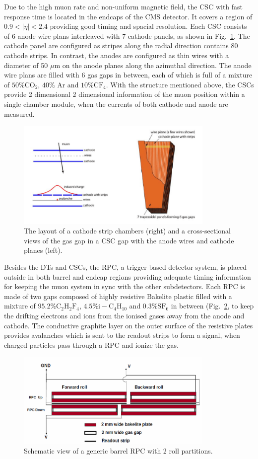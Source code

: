 Due to the high muon rate and non-uniform magnetic field, the CSC with fast response time is located in the endcaps of the CMS detector.
It covers a region of $0.9 < |\eta| < 2.4$ providing good timing and spacial resolution.
Each CSC consists of 6 anode wire plans interleaved with 7 cathode panels, as shown in Fig.~\ref{fig:cms_CSC}.
The cathode panel are configured as stripes along the radial direction contains 80 cathode strips.
In contrast, the anodes are configured as thin wires with a diameter of 50 $\mu$m on the anode planes along the azimuthal direction.
The anode wire plans are filled with 6 gas gaps in between, each of which is full of a mixture of $50\% \mathrm{CO_2}$, $40\%$ Ar and $10\% \mathrm{CF_4}$.
With the structure mentioned above, the CSCs provide 2 dimensional 2 dimensional information of the muon position within a single chamber module, when the currents of both cathode and anode are measured.
\begin{figure}\centering
    \includegraphics[width=0.85\textwidth]{figure/cms_CSC.png}
    \caption[The layout of CSC system in the CMS.]
    {The layout of a cathode strip chambers (right) and a cross-sectional views of the gas gap in a CSC gap with the anode wires and cathode planes  (left).}
    \label{fig:cms_CSC}
\end{figure}

Besides the DTs and CSCs, the RPC, a trigger-based detector system, is placed outside in both barrel and endcap regions providing adequate timing information for keeping the muon system in sync with the other subdetectors.
Each RPC is made of two gaps composed of highly resistive Bakelite plastic filled with a mixture of $95.2\% \mathrm{C_2H_2F_4}$, $4.5\% \mathrm{i-C_4H_{10}}$ and $0.3\% \mathrm{SF_6}$ in between (Fig.~\ref{fig:cms_RPC}, to keep the drifting electrons and ions from the ionised gases away from the anode and cathode.
The conductive graphite layer on the outer surface of the resistive plates provides avalanches which is sent to the readout strips to form a signal, when charged particles pass through a RPC and ionize the gas.

\begin{figure}\centering
    \includegraphics[width=0.85\textwidth]{figure/cms_RPC.png}
    \caption{Schematic view of a generic barrel RPC with 2 roll partitions.}
    \label{fig:cms_RPC}
\end{figure}

